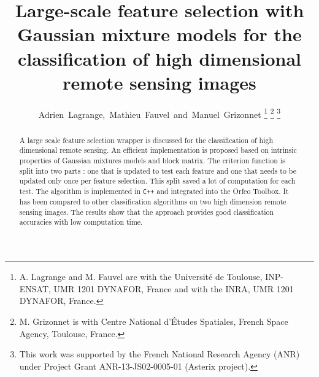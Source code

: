 \documentclass[journal,10pt]{IEEEtran}
\begin{document}
%
\title{Large-scale feature selection with Gaussian mixture models for the classification of high dimensional remote sensing images}
%
%
%

\author{Adrien~Lagrange,~Mathieu~Fauvel~and~Manuel~Grizonnet%
\thanks{A. Lagrange and M. Fauvel are with the Universit\'{e} de Toulouse,
INP-ENSAT, UMR 1201 DYNAFOR, France and with the INRA, UMR 1201
DYNAFOR, France.}%
\thanks{M. Grizonnet is with Centre National d'\'{E}tudes Spatiales, French Space Agency, Toulouse, France.}%
\thanks{This  work was  supported  by the  French National  Research Agency  (ANR)  under  Project Grant  ANR-13-JS02-0005-01  (Asterix project).}}


\maketitle

\begin{abstract}
  A  large  scale  feature  selection wrapper  is  discussed  for  the
  classification  of high  dimensional  remote  sensing. An  efficient
  implementation is proposed based on intrinsic properties of Gaussian
  mixtures models and  block matrix.  The criterion  function is split
  into two parts  : one that is  updated to test each  feature and one
  that needs to be updated only once per feature selection. This split
  saved  a  lot  of  computation  for each  test.   The  algorithm  is
  implemented in  \texttt{C++} and integrated into  the Orfeo Toolbox.
  It has been compared to  other classification algorithms on two high
  dimension remote sensing images. The  results show that the approach
  provides good classification accuracies with low computation time.
\end{abstract}
\end{document}
